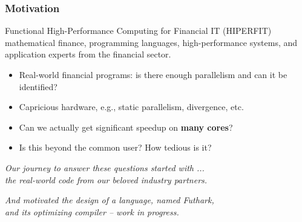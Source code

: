 \documentclass{beamer}
\newcommand{\emp}[1]{\textcolor{DikuRed}{ #1}}
\newcommand{\emphh}[1]{\textcolor{CosGreen}{ #1}}
\begin{document}
\begin{frame}
  \frametitle{Motivation}

Functional High-Performance Computing for Financial IT (HIPERFIT)
mathematical finance, programming languages, high-performance systems, 
and application experts from the financial sector. 
%

\bigskip\pause

\begin{itemize}

    \item Real-world financial programs: is there enough parallelism and can it be identified?\smallskip

    \item Capricious hardware, e.g., static parallelism, divergence, etc.\smallskip

    \item Can we actually get significant speedup on {\bf many cores}?\smallskip

    \item Is this beyond the common user? How tedious is it?\bigskip

\end  {itemize}
\pause

\emp{\em Our journey to answer these questions started with ... \\
            the real-world code from our beloved industry partners.}\bigskip

\emphh{\em And motivated the design of a language, named Futhark,\\
        and its optimizing compiler -- work in progress.}

\end{frame}
\end{document}
